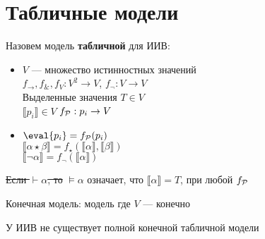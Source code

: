 \documentclass[oneside]{book}
\begin{document}
\section{Табличные модели}
\label{sec:org028c7a8}
\begin{definition}
	Назовем модель \textbf{табличной} для ИИВ:
	\begin{itemize}
		\item \(V\) --- множество истинностных значений \\
		      \(f_\to,f_\&, f_V: V^2 \to V\), \(f_\neg: V \to V\) \\
		      Выделенные значения \(T \in V\) \\
		      \(\llbracket p_i \rrbracket \in V\) \(f_\P : p_i \to V\)
		\item \(\eval{p_i} = f_\P(p_i)\) \\
		      \(\llbracket\alpha \star \beta\rrbracket = f_\star(\llbracket\alpha\rrbracket, \llbracket\beta\rrbracket)\) \\
		      \(\llbracket\neg \alpha\rrbracket = f_\neg(\llbracket\alpha\rrbracket)\)
	\end{itemize}
	\sout{Если \(\vdash \alpha\), то} \(\vDash \alpha\) означает, что \(\llbracket\alpha\rrbracket = T\), при любой \(f_\P\)
	\label{org0ecfc68}
\end{definition}
\begin{definition}
	Конечная модель: модель где \(V\) --- конечно
	\label{orgb94cf4a}
\end{definition}
\begin{theorem}
	У ИИВ не существует полной конечной табличной модели
	\label{orgd371e36}
\end{theorem}
\end{document}
